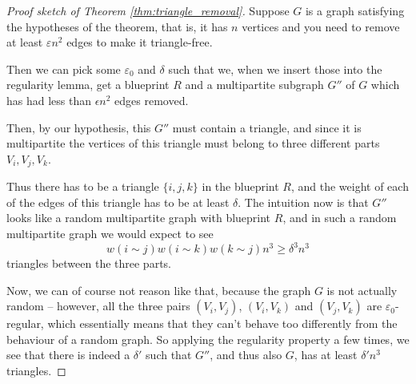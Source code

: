 \documentclass[nobib]{tufte-handout}
\begin{document}
\begin{proof}[Proof sketch of Theorem \ref{thm:triangle_removal}]
    Suppose $G$ is a graph satisfying the hypotheses of the theorem, that is, it has $n$ vertices and you need to remove at least $\varepsilon n^2$ edges to make it triangle-free.

    Then we can pick some $\varepsilon_0$ and $\delta$ such that we, when we insert those into the regularity lemma, get a blueprint $R$ and a multipartite subgraph $G''$ of $G$ which has had less than $\epsilon n^2$ edges removed.

    Then, by our hypothesis, this $G''$ must contain a triangle, and since it is multipartite the vertices of this triangle must belong to three different parts $V_i, V_j, V_k$.

    Thus there has to be a triangle $\{i, j, k\}$ in the blueprint $R$, and the weight of each of the edges of this triangle has to be at least $\delta$. The intuition now is that $G''$ looks like a random multipartite graph with blueprint $R$, and in such a random multipartite graph we would expect to see
    $$w(i\sim j)w(i\sim k)w(k\sim j)n^3 \geq \delta^3 n^3$$
    triangles between the three parts.

    Now, we can of course not reason like that, because the graph $G$ is not actually random -- however, all the three pairs $(V_i, V_j)$, $(V_i, V_k)$ and $(V_j, V_k)$ are $\varepsilon_0$-regular, which essentially means that they can't behave too differently from the behaviour of a random graph. So applying the regularity property a few times, we see that there is indeed a $\delta'$ such that $G''$, and thus also $G$, has at least $\delta' n^3$ triangles.
\end{proof}
\end{document}
